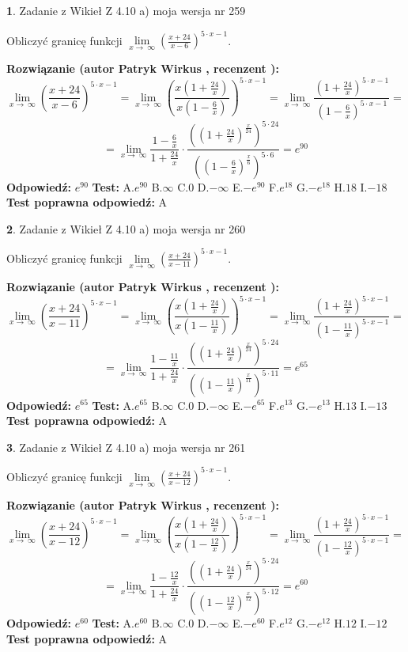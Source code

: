 \documentclass[12pt, a4paper]{article}
\theoremstyle{definition} %
\newtheorem{zad}{}
\newcommand{\zadStart}[1]{\begin{zad}#1\newline}
\newcommand{\zadStop}{\end{zad}}
\newcommand{\rozwStart}[2]{\noindent \textbf{Rozwiązanie (autor #1 , recenzent #2): }\newline}
\newcommand{\rozwStop}{\newline}
\newcommand{\odpStart}{\noindent \textbf{Odpowiedź:}\newline}
\newcommand{\odpStop}{\newline}
\newcommand{\testStart}{\noindent \textbf{Test:}\newline}
\newcommand{\testStop}{\newline}
\newcommand{\kluczStart}{\noindent \textbf{Test poprawna odpowiedź:}\newline}
\newcommand{\kluczStop}{\newline}
\begin{document}
\zadStart{Zadanie z Wikieł Z 4.10 a) moja wersja nr 259}

Obliczyć granicę funkcji  $\lim\limits_{x\to\ \infty}(\frac{x+24}{x-6})^{5\cdot x-1}$.
\zadStop
\rozwStart{Patryk Wirkus}{}
$$\lim\limits_{x\to\ \infty}(\frac{x+24}{x-6})^{5\cdot x-1} = \lim\limits_{x\to\ \infty}(\frac{x(1+\frac{24}{x})}{x(1-\frac{6}{x})})^{5\cdot x-1}=\lim\limits_{x\to\ \infty}\frac{(1+\frac{24}{x})^{5\cdot x-1}}{(1-\frac{6}{x})^{5\cdot x-1}}=$$
$$=\lim\limits_{x\to\ \infty}\frac{1-\frac{6}{x}}{1+\frac{24}{x}}\cdot\frac{((1+\frac{24}{x})^{\frac{x}{24}})^{5\cdot24}}{((1-\frac{6}{x})^{\frac{x}{6}})^{5\cdot6}}=e^{90}$$
\rozwStop
\odpStart
$e^{90}$
\odpStop
\testStart
A.$e^{90}$ B.$\infty$ C.$0$ D.$-\infty$ E.$-e^{90}$
F.$e^{18}$ G.$-e^{18}$
H.$18$
I.$-18$
\testStop
\kluczStart
A
\kluczStop



\zadStart{Zadanie z Wikieł Z 4.10 a) moja wersja nr 260}

Obliczyć granicę funkcji  $\lim\limits_{x\to\ \infty}(\frac{x+24}{x-11})^{5\cdot x-1}$.
\zadStop
\rozwStart{Patryk Wirkus}{}
$$\lim\limits_{x\to\ \infty}(\frac{x+24}{x-11})^{5\cdot x-1} = \lim\limits_{x\to\ \infty}(\frac{x(1+\frac{24}{x})}{x(1-\frac{11}{x})})^{5\cdot x-1}=\lim\limits_{x\to\ \infty}\frac{(1+\frac{24}{x})^{5\cdot x-1}}{(1-\frac{11}{x})^{5\cdot x-1}}=$$
$$=\lim\limits_{x\to\ \infty}\frac{1-\frac{11}{x}}{1+\frac{24}{x}}\cdot\frac{((1+\frac{24}{x})^{\frac{x}{24}})^{5\cdot24}}{((1-\frac{11}{x})^{\frac{x}{11}})^{5\cdot11}}=e^{65}$$
\rozwStop
\odpStart
$e^{65}$
\odpStop
\testStart
A.$e^{65}$ B.$\infty$ C.$0$ D.$-\infty$ E.$-e^{65}$
F.$e^{13}$ G.$-e^{13}$
H.$13$
I.$-13$
\testStop
\kluczStart
A
\kluczStop



\zadStart{Zadanie z Wikieł Z 4.10 a) moja wersja nr 261}

Obliczyć granicę funkcji  $\lim\limits_{x\to\ \infty}(\frac{x+24}{x-12})^{5\cdot x-1}$.
\zadStop
\rozwStart{Patryk Wirkus}{}
$$\lim\limits_{x\to\ \infty}(\frac{x+24}{x-12})^{5\cdot x-1} = \lim\limits_{x\to\ \infty}(\frac{x(1+\frac{24}{x})}{x(1-\frac{12}{x})})^{5\cdot x-1}=\lim\limits_{x\to\ \infty}\frac{(1+\frac{24}{x})^{5\cdot x-1}}{(1-\frac{12}{x})^{5\cdot x-1}}=$$
$$=\lim\limits_{x\to\ \infty}\frac{1-\frac{12}{x}}{1+\frac{24}{x}}\cdot\frac{((1+\frac{24}{x})^{\frac{x}{24}})^{5\cdot24}}{((1-\frac{12}{x})^{\frac{x}{12}})^{5\cdot12}}=e^{60}$$
\rozwStop
\odpStart
$e^{60}$
\odpStop
\testStart
A.$e^{60}$ B.$\infty$ C.$0$ D.$-\infty$ E.$-e^{60}$
F.$e^{12}$ G.$-e^{12}$
H.$12$
I.$-12$
\testStop
\kluczStart
A
\kluczStop
\end{document}
